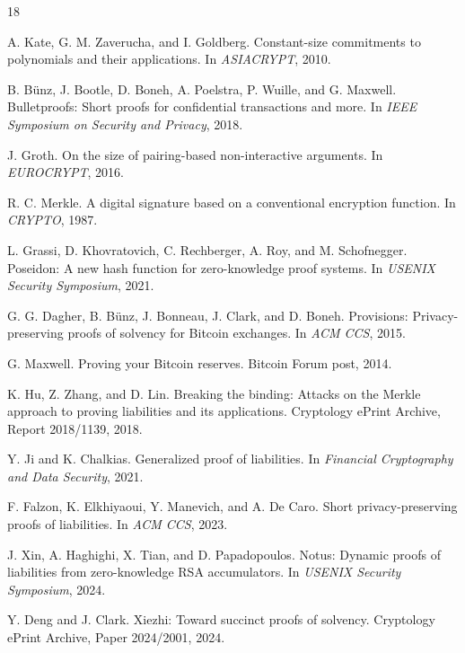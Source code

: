 \documentclass[runningheads]{llncs}
\begin{document}

\begin{thebibliography}{18}

A. Kate, G. M. Zaverucha, and I. Goldberg.
\newblock Constant-size commitments to polynomials and their applications.
\newblock In \emph{ASIACRYPT}, 2010.

B. Bünz, J. Bootle, D. Boneh, A. Poelstra, P. Wuille, and G. Maxwell.
\newblock Bulletproofs: Short proofs for confidential transactions and more.
\newblock In \emph{IEEE Symposium on Security and Privacy}, 2018.

J. Groth.
\newblock On the size of pairing-based non-interactive arguments.
\newblock In \emph{EUROCRYPT}, 2016.

R. C. Merkle.
\newblock A digital signature based on a conventional encryption function.
\newblock In \emph{CRYPTO}, 1987.

L. Grassi, D. Khovratovich, C. Rechberger, A. Roy, and M. Schofnegger.
\newblock Poseidon: A new hash function for zero-knowledge proof systems.
\newblock In \emph{USENIX Security Symposium}, 2021.

G. G. Dagher, B. Bünz, J. Bonneau, J. Clark, and D. Boneh.
\newblock Provisions: Privacy-preserving proofs of solvency for Bitcoin exchanges.
\newblock In \emph{ACM CCS}, 2015.

G. Maxwell.
\newblock Proving your Bitcoin reserves.
\newblock Bitcoin Forum post, 2014.

K. Hu, Z. Zhang, and D. Lin.
\newblock Breaking the binding: Attacks on the Merkle approach to proving liabilities and its applications.
\newblock Cryptology ePrint Archive, Report 2018/1139, 2018.

Y. Ji and K. Chalkias.
\newblock Generalized proof of liabilities.
\newblock In \emph{Financial Cryptography and Data Security}, 2021.

F. Falzon, K. Elkhiyaoui, Y. Manevich, and A. De Caro.
\newblock Short privacy-preserving proofs of liabilities.
\newblock In \emph{ACM CCS}, 2023.

J. Xin, A. Haghighi, X. Tian, and D. Papadopoulos.
\newblock Notus: Dynamic proofs of liabilities from zero-knowledge RSA accumulators.
\newblock In \emph{USENIX Security Symposium}, 2024.

Y. Deng and J. Clark.
\newblock Xiezhi: Toward succinct proofs of solvency.
\newblock Cryptology ePrint Archive, Paper 2024/2001, 2024.


\end{thebibliography}
\end{document}

